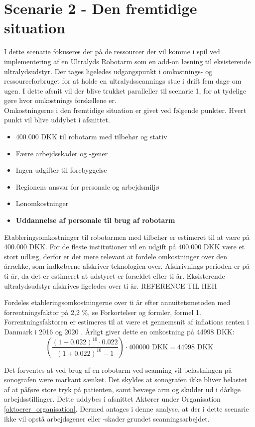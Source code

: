 \section{Scenarie 2 - Den fremtidige situation}
I dette scenarie fokuseres der på de ressourcer der vil komme i spil ved implementering af en Ultralyds Robotarm som en add-on løsning til eksisterende ultralydsudstyr. Der tages ligeledes udgangspunkt i omkostnings- og ressourceforbruget for at holde en ultralydsscannings stue i drift fem dage om ugen. I dette afsnit vil der blive trukket paralleller til scenarie 1, for at tydelige gøre hvor omkostnings forskellene er. \\
Omkostningerne i den fremtidige situation er givet ved følgende punkter. Hvert punkt vil blive uddybet i afsnittet.
\begin{itemize}
\item 400.000 DKK til robotarm med tilbehør og stativ
\item Færre arbejdsskader og -gener
\item Ingen udgifter til forebyggelse
\item Regionens ansvar for personale og arbejdsmiljø
\item Lønomkostninger
\item \textbf{Uddannelse af personale til brug af robotarm }
\end{itemize}
Etableringsomkostninger til robotarmen med tilbehør er estimeret til at være på 400.000 DKK. For de fleste institutioner vil en udgift på 400.000 DKK være et stort udlæg, derfor er det mere relevant at fordele omkostninger over den årrække, som indkøberne afskriver teknologien over. Afskrivnings perioden er på ti år, da det er estimeret at udstyret er forældet efter ti år. Eksisterende ultralydsudstyr afskrives ligeledes over ti år. REFERENCE TIL HEH 

Fordeles etableringsomkostningerne over ti år efter annuitetsmetoden med forrentningsfaktor på 2,2 \%, se Forkortelser og formler, formel 1. Forrentningsfaktoren er estimeres til at være et gennemsnit af inflations renten i Danmark i 2016 og 2020 \cite{inflation}. Årligt giver dette en omkostning på 44998 DKK:
\begin{equation}
\left(\frac{(1+0.022)^{10}\cdot0.022}{(1+0.022)^{10}-1}\right)\cdot400000 \text{ DKK}=44998 \text{ DKK}
\end{equation}

Det forventes at ved brug af en robotarm ved scanning vil belastningen på sonografen være markant sænket. Det skyldes at sonografen ikke bliver belastet af at påføre store tryk på patienten, samt bevæge arm og skulder ud i dårlige arbejdsstillinger. Dette uddybes i afsnittet Aktører under Organisation \ref{aktoerer_organisation}. Dermed antages i denne analyse, at der i dette scenarie ikke vil opstå arbejdsgener eller -skader grundet scanningsarbejdet. 

